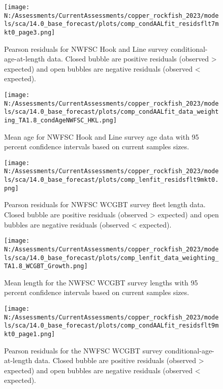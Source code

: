 \documentclass[11pt,
  english,
  letterpaper,
]{article}
\begin{document}
\begin{figure}
\centering
\texttt{[image: N:/Assessments/CurrentAssessments/copper\_rockfish\_2023/models/sca/14.0\_base\_forecast/plots/comp\_condAALfit\_residsflt7mkt0\_page3.png]}
\caption{Pearson residuals for NWFSC Hook and Line survey conditional-age-at-length data. Closed bubble are positive residuals (observed \textgreater{} expected) and open bubbles are negative residuals (observed \textless{} expected).\label{fig:nwfsc-hkl-age-pearson-3}}
\end{figure}

\pagebreak

\begin{figure}
\centering
\texttt{[image: N:/Assessments/CurrentAssessments/copper\_rockfish\_2023/models/sca/14.0\_base\_forecast/plots/comp\_condAALfit\_data\_weighting\_TA1.8\_condAgeNWFSC\_HKL.png]}
\caption{Mean age for NWFSC Hook and Line survey age data with 95 percent confidence intervals based on current samples sizes.\label{fig:nwfsc-hkl-mean-age-fit}}
\end{figure}

\pagebreak

\begin{figure}
\centering
\texttt{[image: N:/Assessments/CurrentAssessments/copper\_rockfish\_2023/models/sca/14.0\_base\_forecast/plots/comp\_lenfit\_residsflt9mkt0.png]}
\caption{Pearson residuals for NWFSC WCGBT survey fleet length data. Closed bubble are positive residuals (observed \textgreater{} expected) and open bubbles are negative residuals (observed \textless{} expected).\label{fig:wcgbt-len-pearson}}
\end{figure}

\pagebreak

\begin{figure}
\centering
\texttt{[image: N:/Assessments/CurrentAssessments/copper\_rockfish\_2023/models/sca/14.0\_base\_forecast/plots/comp\_lenfit\_data\_weighting\_TA1.8\_WCGBT\_Growth.png]}
\caption{Mean length for the NWFSC WCGBT survey lengths with 95 percent confidence intervals based on current samples sizes.\label{fig:wcgbt-mean-len-fit}}
\end{figure}

\pagebreak

\begin{figure}
\centering
\texttt{[image: N:/Assessments/CurrentAssessments/copper\_rockfish\_2023/models/sca/14.0\_base\_forecast/plots/comp\_condAALfit\_residsflt9mkt0\_page1.png]}
\caption{Pearson residuals for the NWFSC WCGBT survey conditional-age-at-length data. Closed bubble are positive residuals (observed \textgreater{} expected) and open bubbles are negative residuals (observed \textless{} expected).\label{fig:wcgbt-age-pearson-1}}
\end{figure}
\end{document}
